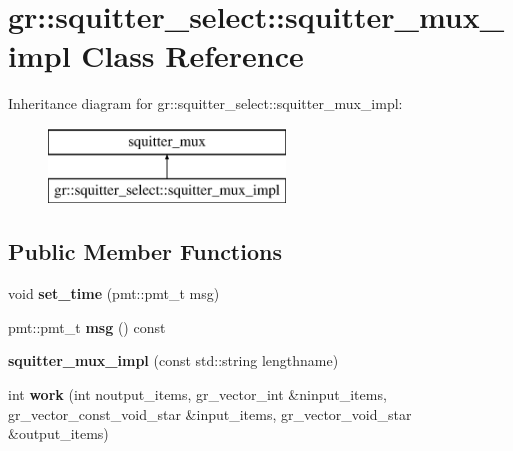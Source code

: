 \hypertarget{classgr_1_1squitter__select_1_1squitter__mux__impl}{}\section{gr\+:\+:squitter\+\_\+select\+:\+:squitter\+\_\+mux\+\_\+impl Class Reference}
\label{classgr_1_1squitter__select_1_1squitter__mux__impl}
Inheritance diagram for gr\+:\+:squitter\+\_\+select\+:\+:squitter\+\_\+mux\+\_\+impl\+:\begin{figure}[H]
\begin{center}
\leavevmode
\includegraphics[height=2.000000cm]{classgr_1_1squitter__select_1_1squitter__mux__impl}
\end{center}
\end{figure}
\subsection*{Public Member Functions}
\begin{DoxyCompactItemize}
\item 
void {\bfseries set\+\_\+time} (pmt\+::pmt\+\_\+t msg)\hypertarget{classgr_1_1squitter__select_1_1squitter__mux__impl_afd37b0a2e8258decea7f334e4a2ef9fe}{}\label{classgr_1_1squitter__select_1_1squitter__mux__impl_afd37b0a2e8258decea7f334e4a2ef9fe}

\item 
pmt\+::pmt\+\_\+t {\bfseries msg} () const \hypertarget{classgr_1_1squitter__select_1_1squitter__mux__impl_aeabc800a78f1537d15d3a89231e88039}{}\label{classgr_1_1squitter__select_1_1squitter__mux__impl_aeabc800a78f1537d15d3a89231e88039}

\item 
{\bfseries squitter\+\_\+mux\+\_\+impl} (const std\+::string lengthname)\hypertarget{classgr_1_1squitter__select_1_1squitter__mux__impl_aaf4cd57c754c4ef7ee1688e441b0c839}{}\label{classgr_1_1squitter__select_1_1squitter__mux__impl_aaf4cd57c754c4ef7ee1688e441b0c839}

\item 
int {\bfseries work} (int noutput\+\_\+items, gr\+\_\+vector\+\_\+int \&ninput\+\_\+items, gr\+\_\+vector\+\_\+const\+\_\+void\+\_\+star \&input\+\_\+items, gr\+\_\+vector\+\_\+void\+\_\+star \&output\+\_\+items)\hypertarget{classgr_1_1squitter__select_1_1squitter__mux__impl_aa3f637f5f4ccc5eb32c9d8738f50a529}{}\label{classgr_1_1squitter__select_1_1squitter__mux__impl_aa3f637f5f4ccc5eb32c9d8738f50a529}

\end{DoxyCompactItemize}
